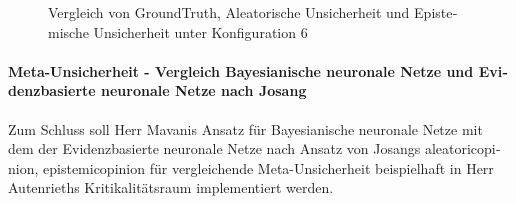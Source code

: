 \begin{otherlanguage}{ngerman}
\begin{figure}[!ht]
  \caption{Vergleich von \gls{GroundTruth}, \gls{Aleatorische Unsicherheit} und \gls{Epistemische Unsicherheit} unter Konfiguration 6}
  \label{fig:three_subfigures3}
\end{figure}




\paragraph{Meta-Unsicherheit - Vergleich \gls{Bayesianische neuronale Netze} und \gls{Evidenzbasierte neuronale Netze} nach Josang} Zum Schluss soll Herr Mavanis Ansatz für \gls{Bayesianische neuronale Netze} mit dem der \gls{Evidenzbasierte neuronale Netze} nach Ansatz von Josangs \gls{aleatoricopinion}, \gls{epistemicopinion} für vergleichende Meta-Unsicherheit beispielhaft in Herr Autenrieths Kritikalitätsraum implementiert werden. 




\end{otherlanguage}
